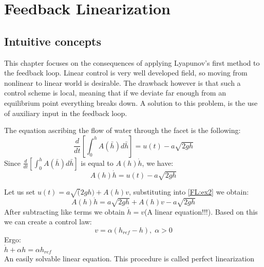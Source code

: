 
\chapter{Feedback Linearization}
\section{Intuitive concepts}
This chapter focuses on the consequences of applying Lyapunov's first method to the feedback loop.
Linear control is very well developed field, so moving from nonlinear to linear world is desirable.
The drawback however is that such a control scheme is local, meaning that if we deviate far enough
from an equilibrium point everything breaks down. A solution to this problem, is the use of 
auxiliary input in the feedback loop.


{
        The equation ascribing the flow of water through the facet is the following:
        \begin{equation}
            \label{FL:ex}
            \frac{d}{dt}[\int_0^h A(\bar{h})d\bar{h}] = u(t) - a\sqrt{2gh}
        \end{equation}
        Since $ \frac{d}{dt}[\int_0^h A(\bar{h})d\bar{h}]$ is equal to $A(h)\dot{h}$,
        we have:
        \begin{equation}
            \label{FL:ex2}
            A(h)\dot{h} = u(t) - a\sqrt{2gh}
        \end{equation}

        Let us set $u(t) = a\sqrt(2gh)+A(h)v$, substituting into  \ref{FL:ex2} we obtain:
        \begin{equation}
            \label{FL:ex_3}
            A(h)\dot{h} = a\sqrt{2gh} + A(h)v - a\sqrt{2gh}
        \end{equation}
        After subtracting like terms we obtain $\dot{h} = v$(A linear equation!!!).
        Based on this we can create a control law:
        \begin{equation}
            \label{FL:excl}
            v = \alpha(h_{ref}-h), \; \alpha > 0
        \end{equation}
        Ergo:\\
        $\dot{h}+\alpha h = \alpha h_{ref}$\\
        An easily solvable linear equation.
        This procedure is called perfect linearization
}

